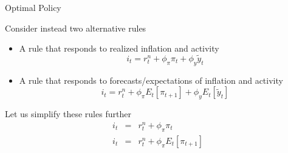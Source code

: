 
	
\begin{frame}{Optimal Policy}

Consider instead two alternative rules
\vspace{2mm}
\begin{itemize}
\item	A rule that responds to realized inflation and activity
\[
i_{t} = r^{n}_{t} + \phi_{\pi} \pi_{t} + \phi_{y} \tilde{y}_{t}	
\]
\item	A rule that responds to forecasts/expectations of inflation and activity
\[
i_{t} = r^{n}_{t} + \phi_{\pi} E_{t}[ \pi_{t+1} ] + \phi_{y} E_{t}[ \tilde{y}_{t} ]
\]
\end{itemize}

Let us simplify these rules further
\begin{eqnarray*}
i_{t} &=& r^{n}_{t} + \phi_{\pi} \pi_{t} 				\label{eqn:taylor_1} \\
i_{t} &=& r^{n}_{t} + \phi_{\pi} E_{t}[ \pi_{t+1} ]		\label{eqn:taylor_2}
\end{eqnarray*}

\end{frame}


	
